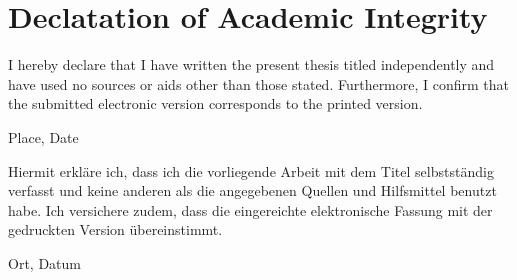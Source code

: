 \chapter*{Declatation of Academic Integrity}

I hereby declare that I have written the present thesis titled \textit{\DerTitelDerArbeit} independently 
and have used no sources or aids other than those stated. Furthermore, I confirm that 
the submitted electronic version corresponds to the printed version.

\vspace{3cm}
Place, Date \hfill \DerAutorDerArbeit


\vspace{1cm}



Hiermit erkläre ich, dass ich die vorliegende Arbeit mit dem Titel \textit{\DerTitelDerArbeit} 
selbstständig verfasst und keine anderen als die angegebenen Quellen und Hilfsmittel benutzt habe. 
Ich versichere zudem, dass die eingereichte elektronische Fassung mit der gedruckten Version übereinstimmt.

\vspace{3cm}
Ort, Datum \hfill \DerAutorDerArbeit
